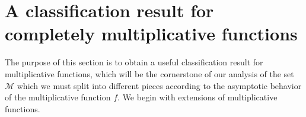 \documentclass[11pt]{amsart}
\theoremstyle{definition}
\newcommand{\N}{{\mathbb N}}
\newcommand{\NN}{{\mathcal N}}
\newcommand{\Q}{{\mathbb Q}}
\newcommand{\mf}{\mathfrak}
\newcommand{\e}{\epsilon}
\newcommand{\WS}[1]{{\color{blue}{{#1}}}}
\newcommand{\AK}[1]{{\color{ForestGreen}{{#1}}}}
\begin{document}

\section{A classification result for completely multiplicative functions}\label{ss5}

The purpose of this section is to obtain a useful classification result for multiplicative functions, which will be the cornerstone of our analysis of the set $\mathcal{M}$ which we must split into different pieces according to the asymptotic behavior of the multiplicative function $f$. We begin with extensions of multiplicative functions.
\end{document}
